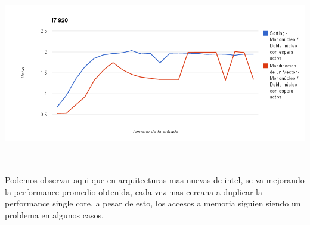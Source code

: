 	\begin{center}
	    \includegraphics[height=8cm]{images/i7-vectorsum-sorting.png}
	\end{center}

	Podemos observar aqui que en arquitecturas mas nuevas de intel, se va mejorando la performance promedio obtenida, cada vez mas cercana a duplicar la performance single core, a pesar de esto, los accesos a memoria siguien siendo un problema en algunos casos.

